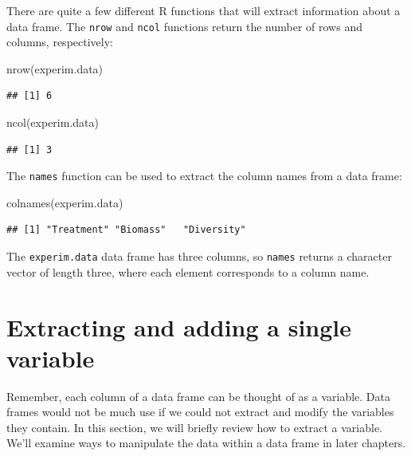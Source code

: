 \documentclass[
]{book}
\newenvironment{Shaded}{\begin{snugshade}}{\end{snugshade}}
\newcommand{\FunctionTok}[1]{\textcolor[rgb]{0.00,0.00,0.00}{#1}}
\newcommand{\NormalTok}[1]{#1}
\begin{document}
There are quite a few different R functions that will extract information about a data frame. The \texttt{nrow} and \texttt{ncol} functions return the number of rows and columns, respectively:

\begin{Shaded}
\begin{Highlighting}[]
\FunctionTok{nrow}\NormalTok{(experim.data)}
\end{Highlighting}
\end{Shaded}

\begin{verbatim}
## [1] 6
\end{verbatim}

\begin{Shaded}
\begin{Highlighting}[]
\FunctionTok{ncol}\NormalTok{(experim.data)}
\end{Highlighting}
\end{Shaded}

\begin{verbatim}
## [1] 3
\end{verbatim}

The \texttt{names} function can be used to extract the column names from a data frame:

\begin{Shaded}
\begin{Highlighting}[]
\FunctionTok{colnames}\NormalTok{(experim.data)}
\end{Highlighting}
\end{Shaded}

\begin{verbatim}
## [1] "Treatment" "Biomass"   "Diversity"
\end{verbatim}

The \texttt{experim.data} data frame has three columns, so \texttt{names} returns a character vector of length three, where each element corresponds to a column name.

\hypertarget{extracting-and-adding-a-single-variable}{%
\section{Extracting and adding a single variable}\label{extracting-and-adding-a-single-variable}}

Remember, each column of a data frame can be thought of as a variable. Data frames would not be much use if we could not extract and modify the variables they contain. In this section, we will briefly review how to extract a variable. We'll examine ways to manipulate the data within a data frame in later chapters.
\end{document}
